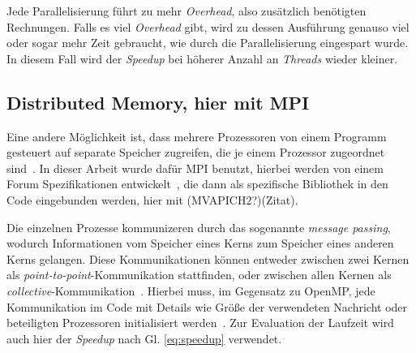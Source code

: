	Jede Parallelisierung führt zu mehr \textit{Overhead}, also zusätzlich benötigten Rechnungen. Falls es viel \textit{Overhead} gibt, wird zu dessen Ausführung genauso viel oder sogar mehr Zeit gebraucht, wie durch die Parallelisierung eingespart wurde. In diesem Fall wird der \textit{Speedup} bei höherer Anzahl an \textit{Threads} wieder kleiner.
	\subsection{Distributed Memory, hier mit MPI}
	\label{subsecmpitheorie}
	Eine andere Möglichkeit ist, dass mehrere Prozessoren von einem Programm gesteuert auf separate Speicher zugreifen, die je einem Prozessor zugeordnet sind~\cite[vgl. ][S. 83]{pachecoparallel}. In dieser Arbeit wurde dafür MPI benutzt, hierbei werden von einem Forum Spezifikationen entwickelt~\cite{mpiforum}, die dann als spezifische Bibliothek in den Code eingebunden werden, hier mit (MVAPICH2?)(Zitat).
	
	Die einzelnen Prozesse kommunizeren durch das sogenannte \textit{message passing}, wodurch Informationen vom Speicher eines Kerns zum Speicher eines anderen Kerns gelangen. Diese Kommunikationen können entweder zwischen zwei Kernen als \textit{point-to-point}-Kommunikation stattfinden, oder zwischen allen Kernen als \textit{collective}-Kommunikation~\cite[vgl. ][S. 83, S. 103f.]{pachecoparallel}. Hierbei muss, im Gegensatz zu OpenMP, jede Kommunikation im Code mit Details wie Größe der verwendeten Nachricht oder beteiligten Prozessoren initialisiert werden~\cite[vgl. ][S. 88ff.]{pachecoparallel}. Zur Evaluation der Laufzeit wird auch hier der \textit{Speedup} nach Gl. \ref{eq:speedup} verwendet.
